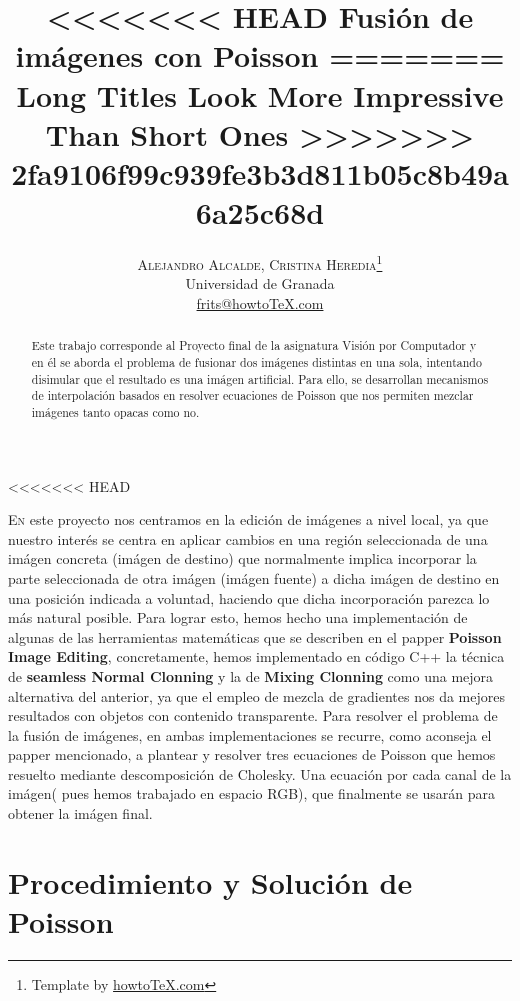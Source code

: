 \documentclass[oneside]{article}
\title{\vspace{-15mm}%
	\fontsize{24pt}{10pt}\selectfont
<<<<<<< HEAD
	\textbf{Fusión de imágenes con Poisson}
=======
	\textbf{Long Titles Look More Impressive Than Short Ones}
>>>>>>> 2fa9106f99c939fe3b3d811b05c8b49a6a25c68d
	}
\author{%
	\large
	\textsc{Alejandro Alcalde, Cristina Heredia}\thanks{Template by \href{http://www.howtotex.com}{howtoTeX.com}} \\[2mm]
	\normalsize	Universidad de Granada \\
	\normalsize	\href{mailto:frits@howtoTeX.com}{frits@howtoTeX.com}
	\vspace{-5mm}
	}
\date{}
\begin{document}
\maketitle
\thispagestyle{fancy}

<<<<<<< HEAD
\begin{abstract}
\noindent Este trabajo corresponde al Proyecto final de la asignatura Visión por Computador y en él se aborda el problema de fusionar dos imágenes
distintas en una sola, intentando disimular que el resultado es una imágen artificial. Para ello, se desarrollan mecanismos de interpolación
basados en resolver ecuaciones de Poisson que nos permiten mezclar imágenes tanto opacas como no.
\end{abstract}


\begin{multicols}{1}
\lettrine[nindent=0em,lines=3]{E}n este proyecto nos centramos en la edición de imágenes a nivel local, ya que nuestro interés se centra en aplicar
cambios en una región seleccionada de una imágen concreta (imágen de destino) que normalmente implica incorporar la parte seleccionada de otra imágen
(imágen fuente)  a dicha imágen de destino en una posición indicada a voluntad, haciendo que dicha incorporación parezca lo más natural posible. \newline \newline Para lograr esto, hemos hecho una implementación
de algunas de las herramientas matemáticas que se describen en el papper \textbf{Poisson Image Editing}, concretamente, hemos implementado en código C++ la técnica de  \textbf{seamless Normal Clonning} y la de \textbf{Mixing Clonning} como una mejora alternativa
del anterior, ya que el empleo de mezcla de gradientes nos da mejores resultados con objetos con contenido transparente. \newline Para resolver el problema de la fusión de imágenes, en ambas implementaciones
se recurre, como aconseja el papper mencionado, a plantear y resolver tres ecuaciones de Poisson que hemos resuelto mediante descomposición de Cholesky. Una ecuación por cada canal de la imágen( pues hemos trabajado en espacio RGB), que finalmente se usarán
para obtener la imágen final. \newline

\section{Procedimiento y Solución de Poisson}


\end{multicols}
\end{document}
